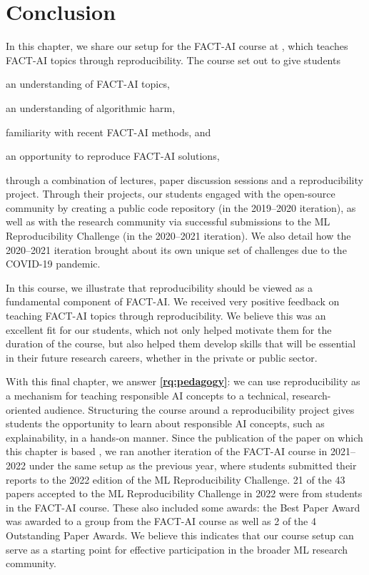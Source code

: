 

\section{Conclusion}
\label{section:fact-conclusion}

In this chapter, we share our setup for the FACT-AI course at \OurUniversity{}, which teaches FACT-AI topics through reproducibility. 
The course set out to give students 
\begin{enumerate*}[label=(\roman*)]
    \item an understanding of FACT-AI topics, 
    \item an understanding of algorithmic harm, 
    \item familiarity with recent FACT-AI methods, and
    \item an opportunity to reproduce FACT-AI solutions, 
\end{enumerate*}
through a combination of lectures, paper discussion sessions and a reproducibility project. 
%
Through their projects, our students engaged with the open-source community by creating a public code repository (in the 2019--2020 iteration), as well as with the research community via successful submissions to the ML Reproducibility Challenge (in the 2020--2021 iteration). 
We also detail how the 2020--2021 iteration brought about its own unique set of challenges due to the COVID-19 pandemic. 

In this course, we illustrate that reproducibility should be viewed as a fundamental component of FACT-AI. 
We received very positive feedback on teaching FACT-AI topics through reproducibility. We believe this was an excellent fit for our students, which not only helped motivate them for the duration of the course, but also helped them develop skills that will be essential in their future research careers, whether in the private or public sector. 


With this final chapter, we answer \textbf{\ref{rq:pedagogy}}: we can use reproducibility as a mechanism for teaching responsible AI concepts to a technical, research-oriented audience. 
Structuring the course around a reproducibility project gives students the opportunity to learn about responsible AI concepts, such as explainability, in a hands-on manner. 
Since the publication of the paper on which this chapter is based \citep{lucic2022reproducibility}, we ran another iteration of the FACT-AI course in 2021--2022 under the same setup as the previous year, where students submitted their reports to the 2022 edition of the ML Reproducibility Challenge. 
21 of the 43 papers accepted to the ML Reproducibility Challenge in 2022 were from students in the FACT-AI course. 
These also included some awards: the Best Paper Award was awarded to a group from the FACT-AI course as well as 2 of the 4 Outstanding Paper Awards. 
We believe this indicates that our course setup can serve as a starting point for effective participation in the broader ML research community. 